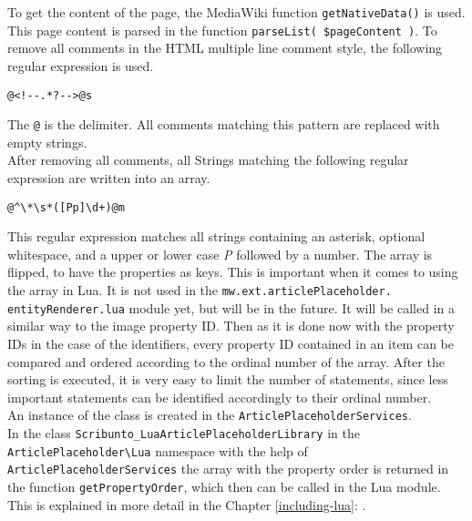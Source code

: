 To get the content of the page, the MediaWiki function \texttt{\justify getNativeData()} is used. This page content is parsed in the function \texttt{\justify parseList( \$pageContent )}. To remove all comments in the HTML multiple line comment style, the following regular expression is used.
\begin{lstlisting}[frame=single]
@<!--.*?-->@s
\end{lstlisting}
The \texttt{\justify @} is the delimiter. All comments matching this pattern are replaced with empty strings. \\
After removing all comments, all Strings matching the following regular expression are written into an array.
\begin{lstlisting}[frame=single] 
@^\*\s*([Pp]\d+)@m
\end{lstlisting}
This regular expression matches all strings containing an asterisk, optional whitespace, and a upper or lower case \textit{P} followed by a number.
The array is flipped, to have the properties as keys. This is important when it comes to using the array in Lua. It is not used in the \texttt{\justify mw.ext.articlePlaceholder. entityRenderer.lua} module yet, but will be in the future. It will be called in a similar way to the image property ID. Then as it is done now with the property IDs in the case of the identifiers, every property ID contained in an item can be compared and ordered according to the ordinal number of the array.  After the sorting is executed, it is very easy to limit the number of statements, since less important statements can be identified accordingly to their ordinal number. \\
An instance of the class is created in the \texttt{\justify ArticlePlaceholderServices}. \\
In the class \texttt{\justify Scribunto\_LuaArticlePlaceholderLibrary} in the \texttt{\justify ArticlePlaceholder\textbackslash{}Lua} namespace with the help of \texttt{\justify ArticlePlaceholderServices} the array with the property order is returned in the function \texttt{\justify getPropertyOrder}, which then can be called in the Lua module. This is explained in more detail in the Chapter \ref{including-lua}: .
